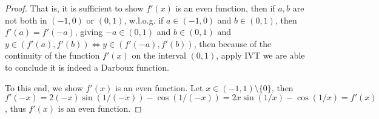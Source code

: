 \documentclass{homework}
\newcommand{\?}{\stackrel{?}{=}}
\theoremstyle{definition}
\begin{document}
\begin{proof}
    That is, it is sufficient to show $f'(x)$ is an even function, then if $a,b$ are not both in $(-1,0)$ or $(0,1)$, w.l.o.g. if $a\in(-1,0)$ and $b\in(0,1)$, then $f'(a)=f'(-a)$, giving $-a\in(0,1)$ and $b\in(0,1)$ and $y\in(f'(a),f'(b))\iff y\in(f'(-a),f'(b))$, then because of the continuity of the function $f'(x)$ on the interval $(0,1)$, apply IVT we are able to conclude it is indeed a Darboux function. 

    To this end, we show $f'(x)$ is an even function. Let $x\in(-1,1)\setminus\{0\}$, then $f'(-x)=2(-x)\sin(1/(-x))-\cos(1/(-x))=2x\sin(1/x)-\cos(1/x)=f'(x)$, thus $f'(x)$ is an even function.
    
    
\end{proof}
\end{document}
